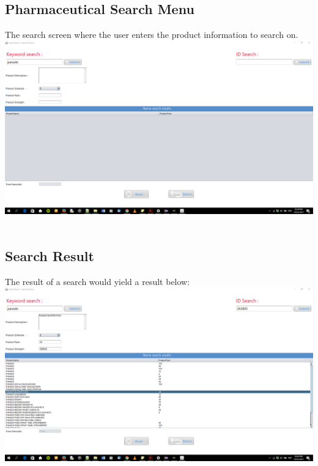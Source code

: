 \documentclass[a4paper,10pt]{article}
\begin{document}
	\subsection{Pharmaceutical Search Menu}
	The search screen where the user enters the product information to search on. \\
	{\centering\includegraphics[width=15cm, scale=0.5]{7.png}} \\ \\
	\subsection{Search Result}
	The result of a search would yield a result below: \\
	{\centering\includegraphics[width=15cm, scale=0.5]{8.png}} \\ \\
	
\end{document}
